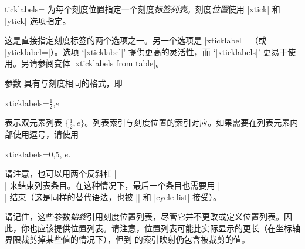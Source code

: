 \begin{pgfplotsxykey}{\x ticklabels=}
\label{pgfplots:key:xticklabels}%
%
    为每个刻度位置指定一个刻度\emph{标签}\emph{列表}。刻度\emph{位置}使用 |xtick| 和 |ytick| 选项指定。

    这是直接指定刻度标签的两个选项之一。另一个选项是 |xticklabel=|（或 |yticklabel=|）。选项 `|xticklabel|' 提供更高的灵活性，而 `|xticklabels|' 更易于使用。另请参阅变体 |xticklabels from table|。

    参数  具有与刻度相同的格式，即
\begin{codeexample}
xticklabels={$\frac{1}{2}$,$e$}
\end{codeexample}
    表示双元素列表 $\{\frac 12, e\}$。列表索引与刻度位置的索引对应。如果需要在列表元素内部使用逗号，请使用
\begin{codeexample}
xticklabels={{0,5}, $e$}.
\end{codeexample}

\begin{codeexample}[]
\end{codeexample}

\begin{codeexample}[]
\end{codeexample}

    请注意，也可以用两个反斜杠 |\\| 来结束列表条目。在这种情况下，最后一个条目也需要用 |\\| 结束（这是同样的替代语法，也被 |\legend| 和 |cycle list| 接受）。

    请记住，这些参数\emph{始终}引用刻度位置列表，尽管它并不更改或定义位置列表。因此，你也应该提供位置列表。请注意，位置列表可能比实际显示的更长（在坐标轴界限裁剪掉某些值的情况下），但到  的索引映射仍包含被裁剪的值。
\end{pgfplotsxykey}


